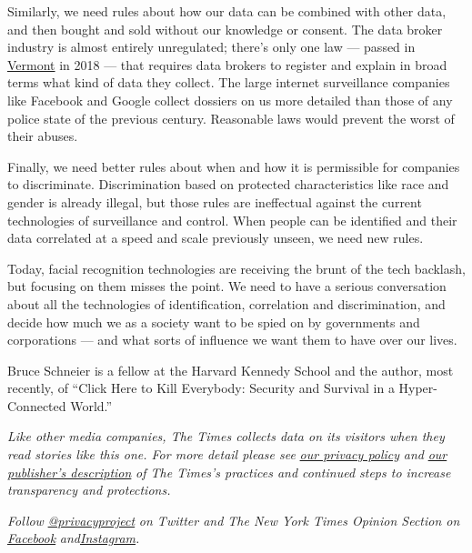 Similarly, we need rules about how our data can be combined with other
data, and then bought and sold without our knowledge or consent. The
data broker industry is almost entirely unregulated; there's only one
law --- passed in
\href{https://www.fastcompany.com/90302036/over-120-data-brokers-inch-out-of-the-shadows-under-landmark-vermont-law}{Vermont}
in 2018 --- that requires data brokers to register and explain in broad
terms what kind of data they collect. The large internet surveillance
companies like Facebook and Google collect dossiers on us more detailed
than those of any police state of the previous century. Reasonable laws
would prevent the worst of their abuses.

Finally, we need better rules about when and how it is permissible for
companies to discriminate. Discrimination based on protected
characteristics like race and gender is already illegal, but those rules
are ineffectual against the current technologies of surveillance and
control. When people can be identified and their data correlated at a
speed and scale previously unseen, we need new rules.

Today, facial recognition technologies are receiving the brunt of the
tech backlash, but focusing on them misses the point. We need to have a
serious conversation about all the technologies of identification,
correlation and discrimination, and decide how much we as a society want
to be spied on by governments and corporations --- and what sorts of
influence we want them to have over our lives.

Bruce Schneier is a fellow at the Harvard Kennedy School and the author,
most recently, of ``Click Here to Kill Everybody: Security and Survival
in a Hyper-Connected World.''

\emph{Like other media companies, The Times collects data on its
visitors when they read stories like this one. For more detail please
see}
\href{https://help.nytimes.com/hc/en-us/articles/115014892108-Privacy-policy?module=inline}{\emph{our
privacy policy}} \emph{and}
\href{https://www.nytimes.com/2019/04/10/opinion/sulzberger-new-york-times-privacy.html?rref=collection\%2Fspotlightcollection\%2Fprivacy-project-does-privacy-matter\&action=click\&contentCollection=opinion\&region=stream\&module=stream_unit\&version=latest\&contentPlacement=8\&pgtype=collection}{\emph{our
publisher's description}} \emph{of The Times's practices and continued
steps to increase transparency and protections.}

\emph{Follow}
\href{https://twitter.com/privacyproject}{\emph{@privacyproject}}
\emph{on Twitter and The New York Times Opinion Section on}
\href{https://www.facebook.com/nytopinion}{\emph{Facebook}}
\emph{and}\href{https://www.instagram.com/nytopinion/}{\emph{Instagram}}\emph{.}

